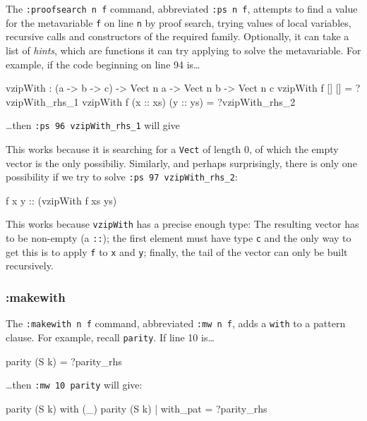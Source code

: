 The \texttt{:proofsearch n f} command, abbreviated \texttt{:ps n f},
attempts to find a value for the metavariable \texttt{f} on line \texttt{n}
by proof search, trying values of local variables, recursive calls
and constructors of the required family.
Optionally, it can take a list of \emph{hints}, which are functions it can
try applying to solve the metavariable.
%
For example, if the code beginning on line 94 is\ldots

\begin{code}
vzipWith : (a -> b -> c) -> 
           Vect n a -> Vect n b -> Vect n c
vzipWith f [] [] = ?vzipWith_rhs_1
vzipWith f (x :: xs) (y :: ys) = ?vzipWith_rhs_2
\end{code}

\ldots then \texttt{:ps 96 vzipWith\_rhs\_1} will give

\begin{code}
[]
\end{code}

\noindent
This works because it is searching for a \texttt{Vect} of length 0, of which
the empty vector is the only possibiliy. Similarly, and perhaps 
surprisingly, there is only one
possibility if we try to solve \texttt{:ps 97 vzipWith\_rhs\_2}:

\begin{code}
f x y :: (vzipWith f xs ys)
\end{code}

\noindent
This works because \texttt{vzipWith} has a precise enough type: The resulting
vector has to be non-empty (a \texttt{::}); the first element must have
type \texttt{c} and the only way to get this is to apply \texttt{f} to
\texttt{x} and \texttt{y}; finally, the tail of the vector can only be
built recursively.

\subsubsection{:makewith}

The \texttt{:makewith n f} command, abbreviated \texttt{:mw n f}, adds a
\texttt{with} to a pattern clause. For example, recall \texttt{parity}.
If line 10 is\ldots

\begin{code}
parity (S k) = ?parity_rhs
\end{code}

\ldots then \texttt{:mw 10 parity} will give:

\begin{code}
parity (S k) with (_)
  parity (S k) | with_pat = ?parity_rhs
\end{code}

